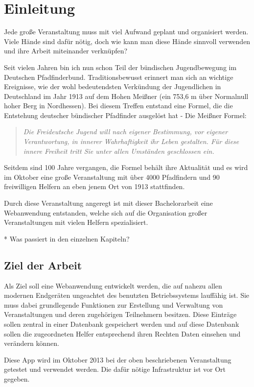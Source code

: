\chapter{Einleitung}
Jede große Veranstaltung muss mit viel Aufwand geplant und organisiert werden. Viele Hände sind dafür nötig, doch wie kann man diese Hände sinnvoll verwenden und ihre Arbeit miteinander verknüpfen?\par

Seit vielen Jahren bin ich nun schon Teil der bündischen Jugendbewegung im Deutschen Pfadfinderbund. Traditionsbewusst erinnert man sich an wichtige Ereignisse, wie der wohl bedeutendsten Verkündung der Jugendlichen in Deutschland im Jahr 1913 auf dem Hohen Meißner (ein 753,6 m über Normalnull hoher Berg in Nordhessen). Bei diesem Treffen entstand eine Formel, die die Entstehung deutscher bündischer Pfadfinder ausgelöst hat - Die Meißner Formel:
\begin{quote}
	\textit{\glqq Die Freideutsche Jugend will nach eigener Bestimmung, vor eigener Verantwortung, in innerer Wahrhaftigkeit ihr Leben gestalten. Für diese innere Freiheit tritt Sie unter allen Umständen geschlossen ein.\grqq{}}\cite[S. 109]{meissnerformel}
\end{quote}
Seitdem sind 100 Jahre vergangen, die Formel behält ihre Aktualität und es wird im Oktober eine große Veranstaltung mit über 4000 Pfadfindern und 90 freiwilligen Helfern an eben jenem Ort von 1913 stattfinden.\par

Durch diese Veranstaltung angeregt ist mit dieser Bachelorarbeit eine Webanwendung entstanden, welche sich auf die Organisation großer Veranstaltungen mit vielen Helfern spezialisiert.

* Was passiert in den einzelnen Kapiteln?

\section{Ziel der Arbeit}
Als Ziel soll eine Webanwendung entwickelt werden, die auf nahezu allen modernen Endgeräten ungeachtet des benutzten Betriebssystems lauffähig ist. Sie muss dabei grundlegende Funktionen zur Erstellung und Verwaltung von Veranstaltungen und deren zugehörigen Teilnehmern besitzen. Diese Einträge sollen zentral in einer Datenbank gespeichert werden und auf diese Datenbank sollen die zugeordneten Helfer entsprechend ihren Rechten Daten einsehen und verändern können.\par
Diese App wird im Oktober 2013 bei der oben beschriebenen Veranstaltung getestet und verwendet werden. Die dafür nötige Infrastruktur ist vor Ort gegeben.
